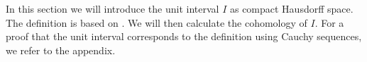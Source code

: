 In this section we will introduce the unit interval $I$ as compact Hausdorff space. 
The definition is based on \cite{Bishop}. 
We will then calculate the cohomology of $I$. 
For a proof that the unit interval corresponds to the definition using Cauchy sequences, 
we refer to the appendix. 


%

%
%


%
%
%
%
